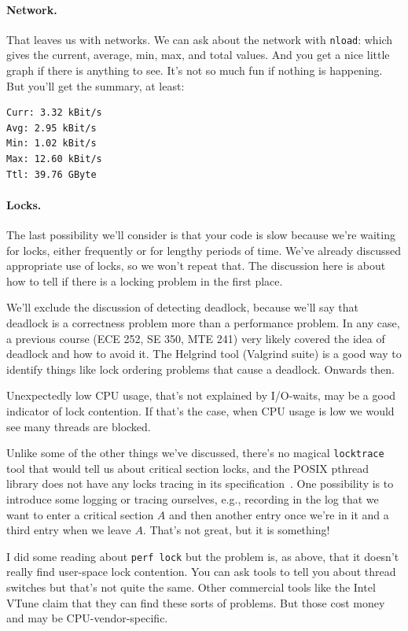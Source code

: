 \documentclass[a4paper]{report}
\begin{document}
\paragraph{Network.} That leaves us with networks. We can ask about the network with \texttt{nload}: which gives the current, average, min, max, and total values. And you get a nice little graph if there is anything to see. It's not so much fun if nothing is happening. But you'll get the summary, at least:

\begin{verbatim}
Curr: 3.32 kBit/s
Avg: 2.95 kBit/s
Min: 1.02 kBit/s
Max: 12.60 kBit/s
Ttl: 39.76 GByte                                                                                       \end{verbatim}

\paragraph{Locks.}
The last possibility we'll consider is that your code is slow because we're waiting for locks, either frequently or for lengthy periods of time. We've already discussed appropriate use of locks, so we won't repeat that. The discussion here is about how to tell if there is a locking problem in the first place.

We'll exclude the discussion of detecting deadlock, because we'll say that deadlock is a correctness problem more than a performance problem. In any case, a previous course (ECE 252, SE 350, MTE 241) very likely covered the idea of deadlock and how to avoid it. The Helgrind tool (Valgrind suite) is a good way to identify things like lock ordering problems that cause a deadlock. Onwards then. 

Unexpectedly low CPU usage, that's not explained by I/O-waits, may be a good indicator of lock contention. If that's the case, when CPU usage is low we would see many threads are blocked. 

Unlike some of the other things we've discussed, there's no magical \texttt{locktrace} tool that would tell us about critical section locks, and the POSIX pthread library does not have any locks tracing in its specification~\cite{usd}. One possibility is to introduce some logging or tracing ourselves, e.g., recording in the log that we want to enter a critical section $A$ and then another entry once we're in it and a third entry when we leave $A$. That's not great, but it is something! 

I did some reading about \texttt{perf lock} but the problem is, as above, that it doesn't really find user-space lock contention. You can ask tools to tell you about thread switches but that's not quite the same. Other commercial tools like the Intel VTune claim that they can find these sorts of problems. But those cost money and may be CPU-vendor-specific.
\end{document}
